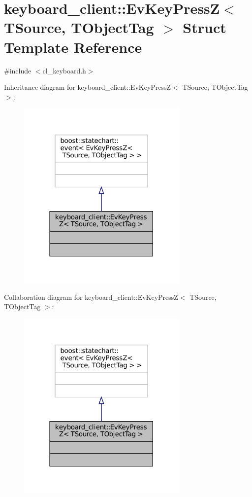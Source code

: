 \hypertarget{structkeyboard__client_1_1EvKeyPressZ}{}\section{keyboard\+\_\+client\+:\+:Ev\+Key\+PressZ$<$ T\+Source, T\+Object\+Tag $>$ Struct Template Reference}
\label{structkeyboard__client_1_1EvKeyPressZ}


{\ttfamily \#include $<$cl\+\_\+keyboard.\+h$>$}



Inheritance diagram for keyboard\+\_\+client\+:\+:Ev\+Key\+PressZ$<$ T\+Source, T\+Object\+Tag $>$\+:
\nopagebreak
\begin{figure}[H]
\begin{center}
\leavevmode
\includegraphics[width=237pt]{structkeyboard__client_1_1EvKeyPressZ__inherit__graph}
\end{center}
\end{figure}


Collaboration diagram for keyboard\+\_\+client\+:\+:Ev\+Key\+PressZ$<$ T\+Source, T\+Object\+Tag $>$\+:
\nopagebreak
\begin{figure}[H]
\begin{center}
\leavevmode
\includegraphics[width=237pt]{structkeyboard__client_1_1EvKeyPressZ__coll__graph}
\end{center}
\end{figure}


